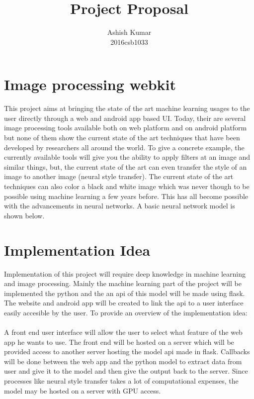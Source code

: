 \documentclass[journal]{IEEEtran}
\begin{document}
\title{Project Proposal}

\author{

Ashish Kumar\\
2016csb1033

}

\maketitle


\section{\textbf{Image processing webkit}}
This project aims at bringing the state of the art machine learning usages to the user directly through a web and android app based UI. Today, their are several image processing tools available both on web platform and on android platform but none of them show the current state of the art techniques that have been developed by researchers all around the world. To give a concrete example, the currently available tools will give you the ability to apply filters at an image and similar things, but, the current state of the art can even transfer the style of an image to another image (neural style transfer). The current state of the art techniques can also color a black and white image which was never though to be possible using machine learning a few years before. This has all become possible with the advancements in neural networks. A basic neural network model is shown below.
\\

\section{Implementation Idea}
Implementation of this project will require deep knowledge in machine learning and image processing. Mainly the machine learning part of the project will be implemented the python and the an api of this model will be made using flask. The website and android app will be created to link the api to a user interface easily accesible by the user. To provide an overview of the implementation idea: 
\\
\\
A front end user interface will allow the user to select what feature of the web app he wants to use. The front end will be hosted on a server which will be provided access to another server hosting the model api made in flask. Callbacks will be done between the web app and the python model to extract data from user and give it to the model and then give the output back to the server. Since processes like neural style transfer takes a lot of computational expenses, the model may be hosted on a server with GPU access.
\end{document}
